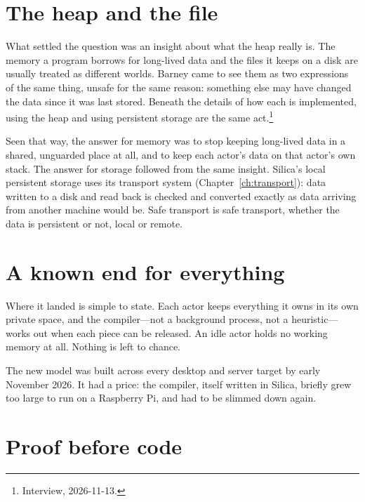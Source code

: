 \section{The heap and the file}

What settled the question was an insight about what the heap really is. The
memory a program borrows for long-lived data and the files it keeps on a disk
are usually treated as different worlds. Barney came to see them as two
expressions of the same thing, unsafe for the same reason: something else may
have changed the data since it was last stored. Beneath the details of how each
is implemented, using the heap and using persistent storage are the
same act.\footnote{Interview, 2026-11-13.}

Seen that way, the answer for memory was to stop keeping long-lived data in a
shared, unguarded place at all, and to keep each actor's data on that actor's
own stack. The answer for storage followed from the same insight. Silica's
local persistent storage uses its transport system
(Chapter~\ref{ch:transport}): data written to a disk and read back is checked and
converted exactly as data arriving from another machine would be. Safe transport
is safe transport, whether the data is persistent or not, local or remote.


\section{A known end for everything}

Where it landed is simple to state. Each actor keeps everything it owns in its
own private space, and the compiler---not a background process, not a
heuristic---works out when each piece can be released. An idle actor holds no
working memory at all. Nothing is left to chance.

The new model was built across every desktop and server target by early
November 2026. It had a price: the compiler, itself written in Silica, briefly
grew too large to run on a Raspberry Pi, and had to be slimmed down again.


\section{Proof before code}
\label{sec:proof}

